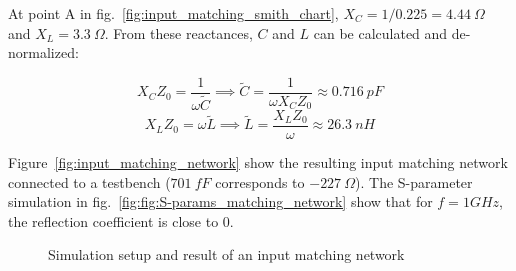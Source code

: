 \documentclass[report.tex]{subfiles}
\begin{document}
At point A in fig.~\ref{fig:input_matching_smith_chart}, $X_C=1/0.225=4.44~\Omega$ and $X_L=3.3~\Omega$. From these reactances, $C$ and $L$ can be calculated and de-normalized:

\begin{equation*}
    X_C Z_0 = \frac{1}{\omega \tilde{C}} \implies
    \tilde{C} = \frac{1}{\omega X_C Z_0} \approx 0.716 ~pF
\end{equation*}
\begin{equation*}
    X_L Z_0=\omega \tilde{L} \implies 
    \tilde{L}=\frac{X_L Z_0}{\omega} \approx 26.3~nH
\end{equation*}

Figure~\ref{fig:input_matching_network} show the resulting input matching network connected to a testbench ($701~fF$ corresponds to $-227~\Omega$). The S-parameter simulation in fig.~\ref{fig:fig:S-params_matching_network} show that for $f=1GHz$, the reflection coefficient is close to 0.

\begin{figure}
    \centering
    
    \caption{Simulation setup and result of an input matching network}
\end{figure}

\clearpage %
\end{document}
